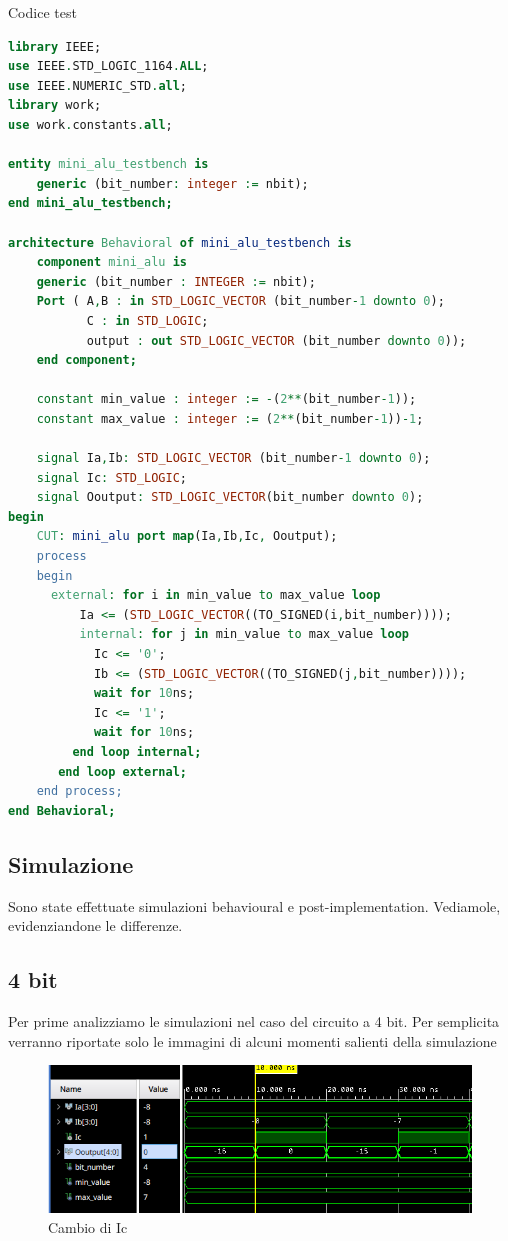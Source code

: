 \begin{problem}{Codice test}{}
\begin{lstlisting}[language=VHDL]
library IEEE;
use IEEE.STD_LOGIC_1164.ALL;
use IEEE.NUMERIC_STD.all;
library work;
use work.constants.all;

entity mini_alu_testbench is
    generic (bit_number: integer := nbit);
end mini_alu_testbench;

architecture Behavioral of mini_alu_testbench is
    component mini_alu is
    generic (bit_number : INTEGER := nbit);
    Port ( A,B : in STD_LOGIC_VECTOR (bit_number-1 downto 0);
           C : in STD_LOGIC;
           output : out STD_LOGIC_VECTOR (bit_number downto 0));
    end component;
    
    constant min_value : integer := -(2**(bit_number-1));
    constant max_value : integer := (2**(bit_number-1))-1;

    signal Ia,Ib: STD_LOGIC_VECTOR (bit_number-1 downto 0);
    signal Ic: STD_LOGIC;
    signal Ooutput: STD_LOGIC_VECTOR(bit_number downto 0);
begin 
    CUT: mini_alu port map(Ia,Ib,Ic, Ooutput);
    process 
    begin
      external: for i in min_value to max_value loop
          Ia <= (STD_LOGIC_VECTOR((TO_SIGNED(i,bit_number))));
          internal: for j in min_value to max_value loop
            Ic <= '0';
            Ib <= (STD_LOGIC_VECTOR((TO_SIGNED(j,bit_number))));
            wait for 10ns;
            Ic <= '1';
            wait for 10ns;
         end loop internal;
       end loop external;   
    end process;
end Behavioral;
\end{lstlisting}
\end{problem}

\subsection{Simulazione}
Sono state effettuate simulazioni behavioural e post-implementation. Vediamole, evidenziandone le differenze.
\subsection{4 bit}
Per prime analizziamo le simulazioni nel caso del circuito a 4 bit.
Per semplicita verranno riportate solo le immagini di alcuni momenti salienti della simulazione \\
\begin{figure}[ht]
      \centering
      \includegraphics[width=1\textwidth]{assets/simulations/behavioural/4bit/4bit_behav.png}
      \caption{Cambio di Ic}
      \label{4bit_behav}
\end{figure}

